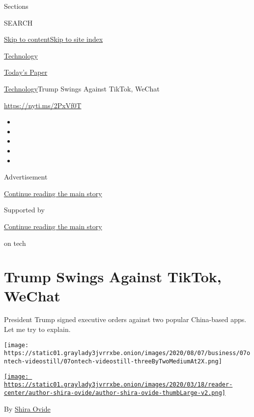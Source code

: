 Sections

SEARCH

\protect\hyperlink{site-content}{Skip to
content}\protect\hyperlink{site-index}{Skip to site index}

\href{https://www.nytimes3xbfgragh.onion/section/technology}{Technology}

\href{https://myaccount.nytimes3xbfgragh.onion/auth/login?response_type=cookie\&client_id=vi}{}

\href{https://www.nytimes3xbfgragh.onion/section/todayspaper}{Today's
Paper}

\href{/section/technology}{Technology}\textbar{}Trump Swings Against
TikTok, WeChat

\href{https://nyti.ms/2PxVf0T}{https://nyti.ms/2PxVf0T}

\begin{itemize}
\item
\item
\item
\item
\item
\end{itemize}

Advertisement

\protect\hyperlink{after-top}{Continue reading the main story}

Supported by

\protect\hyperlink{after-sponsor}{Continue reading the main story}

on tech

\hypertarget{trump-swings-against-tiktok-wechat}{%
\section{Trump Swings Against TikTok,
WeChat}\label{trump-swings-against-tiktok-wechat}}

President Trump signed executive orders against two popular China-based
apps. Let me try to explain.

\texttt{[image: https://static01.graylady3jvrrxbe.onion/images/2020/08/07/business/07ontech-videostill/07ontech-videostill-threeByTwoMediumAt2X.png]}

\href{https://www.nytimes3xbfgragh.onion/by/shira-ovide}{\texttt{[image: https://static01.graylady3jvrrxbe.onion/images/2020/03/18/reader-center/author-shira-ovide/author-shira-ovide-thumbLarge-v2.png]}}

By \href{https://www.nytimes3xbfgragh.onion/by/shira-ovide}{Shira Ovide}

